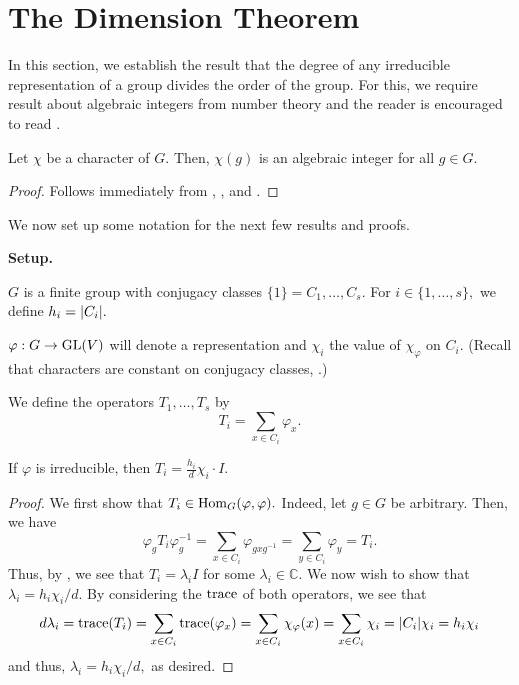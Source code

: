 \section{The Dimension Theorem} \label{sec:03}
In this section, we establish the result that the degree of any irreducible representation of a group divides the order of the group. For this, we require result about algebraic integers from number theory and the reader is encouraged to read .

\begin{prop} \label{prop:charisalgint}
	Let $\chi$ be a character of $G.$ Then, $\chi(g)$ is an algebraic integer for all $g \in G.$
\end{prop}
\begin{proof} 
	Follows immediately from , , and .
\end{proof}

We now set up some notation for the next few results and proofs.

\begin{aside}
	\textbf{Setup.}

	$G$ is a finite group with conjugacy classes $\{1\} = C_1, \ldots, C_s.$ For $i \in \{1, \ldots, s\},$ we define $h_i = {\left\lvert C_i \right\lvert}.$

	$\varphi : G \to \operatorname{GL}(V)$ will denote a representation and $\chi_i$ the value of $\chi_\varphi$ on $C_i.$ (Recall that characters are constant on conjugacy classes, .)

	We define the operators $T_1, \ldots, T_s$ by
	\begin{equation*} 
		T_i = \sum_{x \in C_i} \varphi_x.
	\end{equation*}
\end{aside}

\begin{lem}
	If $\varphi$ is irreducible, then $T_i = \frac{h_i}{d}\chi_i \cdot I.$
\end{lem}
\begin{proof} 
	We first show that $T_i \in \operatorname{Hom}_{G}(\varphi, \varphi).$ Indeed, let $g \in G$ be arbitrary. Then, we have
	\begin{equation*} 
		\varphi_gT_i\varphi_g^{-1} = \sum_{x \in C_i} \varphi_{gxg^{-1}} = \sum_{y \in C_i} \varphi_y = T_i.
	\end{equation*}
	Thus, by , we see that $T_i = \lambda_iI$ for some $\lambda_i \in \mathbb{C}.$ We now wish to show that $\lambda_i = h_i\chi_i/d.$ By considering the $\operatorname{trace}$ of both operators, we see that
	\begin{equation*} 
		d\lambda_i = \operatorname{trace}(T_i) = \sum_{x \in C_i} \operatorname{trace}(\varphi_x) = \sum_{x \in C_i} \chi_\varphi(x) = \sum_{x \in C_i} \chi_i = {\left\lvert C_i \right\lvert}\chi_i = h_i\chi_i
	\end{equation*}
	and thus, $\lambda_i = h_i\chi_i/d,$ as desired.
\end{proof}

